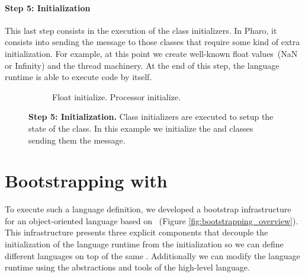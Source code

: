 \paragraph{\textbf{Step 5: Initialization}}
This last step consists in the execution of the class initializers. In Pharo, it consists into sending the message  to those classes that require some kind of extra initialization. For example, at this point we create well-known float values~(\eg NaN or Infinity) and the thread machinery. At the end of this step, the language runtime is able to execute code by itself.

\begin{figure}[ht]
\begin{subfigure}{.4\linewidth}
\begin{code}
Float initialize.
Processor initialize.
\end{code}
\end{subfigure}
\caption{\textbf{Step 5: Initialization.} Class initializers are executed to setup the state of the class. In this example we initialize the  and  classes sending them the  message.\label{fig:method_installation}}
\end{figure}




\section{Bootstrapping with \Vtt}\label{sec:bootstrapping_infrastructure}

To execute such a language definition, we developed a bootstrap infrastructure for an object-oriented language based on \Vtt~(Figure \ref{fig:bootstrapping_overview}). This infrastructure presents three explicit components that decouple the initialization of the language runtime from the \VM initialization so we can define different languages on top of the same \VM. Additionally we can modify the language runtime using the abstractions and tools of the high-level language.

